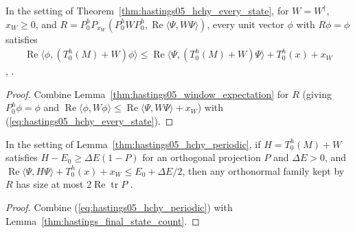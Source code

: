 \begin{lemma}
    \label{thm:hastings05_hchy_periodic}
    \leanok
    In the setting of Theorem~\ref{thm:hastings05_hchy_every_state}, for
    $W=W^\dagger$, $x_W\ge0$, and
    $R=P_0^hP_{x_W}(P_0^hWP_0^h,\operatorname{Re}\langle\Psi,W\Psi\rangle)$,
    every unit vector $\phi$ with $R\phi=\phi$ satisfies
    \begin{align}
        \operatorname{Re}\langle\phi,(T_0^h(M)+W)\phi\rangle
        \le\operatorname{Re}\langle\Psi,(T_0^h(M)+W)\Psi\rangle+T_0^h(x)+x_W
        \label{eq:hastings05_hchy_periodic}
    \end{align}
    \cite[eq.~(hchy), lines 709--720]{Hastings2006Solving},
    \cite{gap:hastings05_hierarchical_energy}.
\end{lemma}
\begin{proof}\leanok
    Combine Lemma~\ref{thm:hastings05_window_expectation} for $R$ (giving
    $P_0^h\phi=\phi$ and
    $\operatorname{Re}\langle\phi,W\phi\rangle\le\operatorname{Re}\langle\Psi,W\Psi\rangle+x_W$)
    with (\ref{eq:hastings05_hchy_every_state}).
\end{proof}

\begin{lemma}
    \label{thm:hastings05_final_state_count_periodic}
    \leanok
    In the setting of Lemma~\ref{thm:hastings05_hchy_periodic}, if
    $H=T_0^h(M)+W$ satisfies $H-E_0\ge\Delta E(1-P)$ for an orthogonal
    projection $P$ and $\Delta E>0$, and
    $\operatorname{Re}\langle\Psi,H\Psi\rangle+T_0^h(x)+x_W\le E_0+\Delta E/2$,
    then any orthonormal family kept by $R$ has size at most
    $2\operatorname{Re}\operatorname{tr}P$
    \cite[lines 722--730]{Hastings2006Solving}.
\end{lemma}
\begin{proof}\leanok
    Combine (\ref{eq:hastings05_hchy_periodic}) with
    Lemma~\ref{thm:hastings_final_state_count}.
\end{proof}

